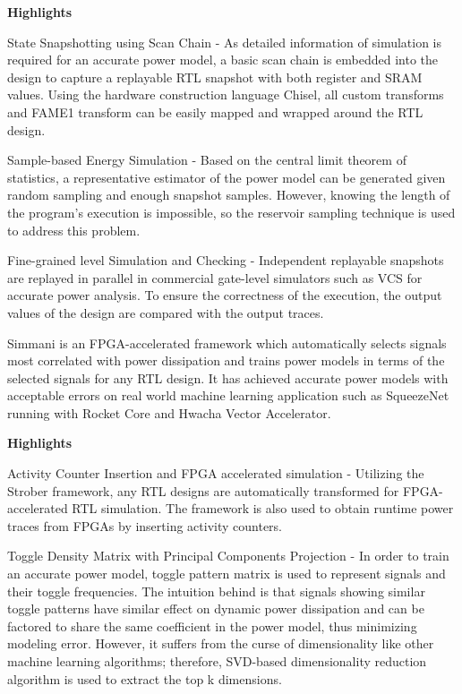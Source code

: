 \documentclass[11pt]{article}
\begin{document}
\textbf{Highlights}

State Snapshotting using Scan Chain - As detailed information of simulation is required
for an accurate power model, a basic scan chain is embedded into the design to capture
a replayable RTL snapshot with both register and SRAM values. Using the hardware
construction language Chisel, all custom transforms and FAME1 transform can be easily
mapped and wrapped around the RTL design.

Sample-based Energy Simulation - Based on the central limit theorem of statistics,
a representative estimator of the power model can be generated given random sampling
and enough snapshot samples. However, knowing the length of the program's execution
is impossible, so the reservoir sampling technique is used to address this problem.

Fine-grained level Simulation and Checking - Independent replayable snapshots are replayed in parallel in
commercial gate-level simulators such as VCS for accurate power analysis. To ensure the correctness of the execution, the output values
of the design are compared with the output traces.

Simmani\autocite{simmani} is an FPGA-accelerated framework which automatically selects signals most correlated with power dissipation and trains power models in terms of the selected signals for any RTL design. It has achieved accurate power models with acceptable errors on real world machine learning application such as SqueezeNet running with Rocket Core and Hwacha Vector Accelerator.

\textbf{Highlights}

Activity Counter Insertion and FPGA accelerated simulation - Utilizing the Strober framework, any RTL designs are automatically transformed for FPGA-accelerated RTL simulation. The framework is also used to obtain runtime power traces from FPGAs by inserting activity counters.

Toggle Density Matrix with Principal Components Projection - In order to train an accurate power model, toggle pattern matrix is used to represent signals and their toggle frequencies. The intuition behind is that signals showing similar toggle patterns have similar effect on dynamic power dissipation and can be factored to share the same coefficient in the power model, thus minimizing modeling error. However, it suffers from the curse of dimensionality like other machine learning algorithms; therefore, SVD-based dimensionality reduction algorithm is used to extract the top k dimensions.
\end{document}
